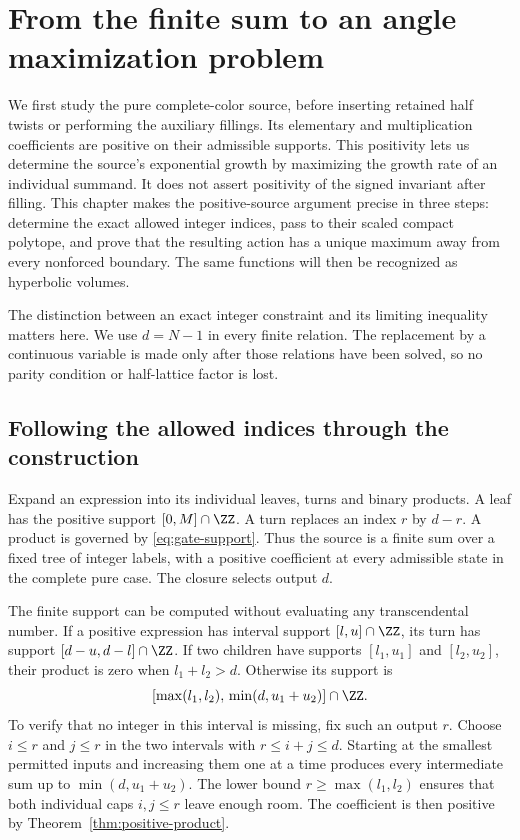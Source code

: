 \chapter{From the finite sum to an angle maximization problem}\label{ch:entropy}

We first study the pure complete-color source, before inserting retained half twists or performing the auxiliary fillings. Its elementary and multiplication coefficients are positive on their admissible supports. This positivity lets us determine the source's exponential growth by maximizing the growth rate of an individual summand. It does not assert positivity of the signed invariant after filling. This chapter makes the positive-source argument precise in three steps: determine the exact allowed integer indices, pass to their scaled compact polytope, and prove that the resulting action has a unique maximum away from every nonforced boundary. The same functions will then be recognized as hyperbolic volumes.

The distinction between an exact integer constraint and its limiting inequality matters here. We use $d=N-1$ in every finite relation. The replacement by a continuous variable is made only after those relations have been solved, so no parity condition or half-lattice factor is lost.

\section{Following the allowed indices through the construction}
Expand an expression into its individual leaves, turns and binary products. A leaf has the positive support $[0,M]\cap\ZZ$. A turn replaces an index $r$ by $d-r$. A product is governed by \eqref{eq:gate-support}. Thus the source is a finite sum over a fixed tree of integer labels, with a positive coefficient at every admissible state in the complete pure case. The closure selects output $d$.

The finite support can be computed without evaluating any transcendental number. If a positive expression has interval support $[l,u]\cap\ZZ$, its turn has support $[d-u,d-l]\cap\ZZ$. If two children have supports $[l_1,u_1]$ and $[l_2,u_2]$, their product is zero when $l_1+l_2>d$. Otherwise its support is
\begin{equation}\label{eq:interval-compiler}
 [\max(l_1,l_2),\,\min(d,u_1+u_2)]\cap\ZZ.
\end{equation}
To verify that no integer in this interval is missing, fix such an output $r$. Choose $i\le r$ and $j\le r$ in the two intervals with $r\le i+j\le d$. Starting at the smallest permitted inputs and increasing them one at a time produces every intermediate sum up to $\min(d,u_1+u_2)$. The lower bound $r\ge\max(l_1,l_2)$ ensures that both individual caps $i,j\le r$ leave enough room. The coefficient is then positive by Theorem~\ref{thm:positive-product}.

